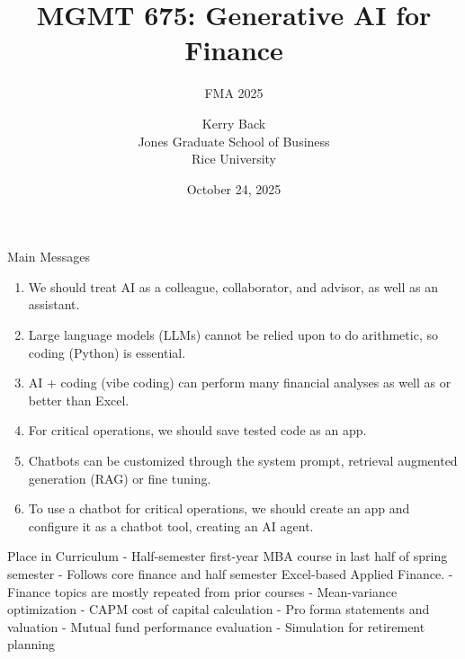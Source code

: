 \documentclass[10pt]{beamer}
\title{MGMT 675: Generative AI for Finance}
\subtitle{FMA 2025}
\date{October 24, 2025}
\author{Kerry Back\\ 
Jones Graduate School of Business\\
Rice University}
\begin{document}
\maketitle

\begin{frame}{Main Messages}
    \begin{enumerate}
    \item We should treat AI as a colleague, collaborator, and advisor, as well as an assistant. 
\item Large language models (LLMs) cannot be relied upon to do arithmetic, so coding (Python) is essential.  
\item AI + coding (vibe coding) can perform many financial analyses as well as or better than Excel.
\item For critical operations, we should save tested code as an app.
\item Chatbots can be customized through the system prompt, retrieval augmented generation (RAG) or fine tuning.
\item To use a chatbot for critical operations, we should create an app and configure it as a chatbot tool, creating an AI agent.
    \end{enumerate}
\end{frame}

\begin{frame}{Place in Curriculum}
 - Half-semester first-year MBA course in last half of spring semester
 - Follows core finance and half semester Excel-based Applied Finance.
 - Finance topics are mostly repeated from prior courses
    - Mean-variance optimization
    - CAPM cost of capital calculation
    - Pro forma statements and valuation
    - Mutual fund performance evaluation
    - Simulation for retirement planning
\end{frame}
\end{document}
